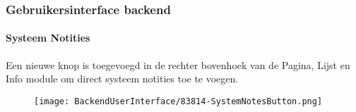 %

\begin{frame}[fragile]
	\frametitle{Gebruikersinterface backend}
	\framesubtitle{Systeem Notities}

    Een nieuwe knop is toegevoegd in de rechter bovenhoek van de Pagina, Lijst en
    Info module om direct systeem notities toe te voegen.

	\begin{figure}
		\texttt{[image: BackendUserInterface/83814-SystemNotesButton.png]}
	\end{figure}

\end{frame}

